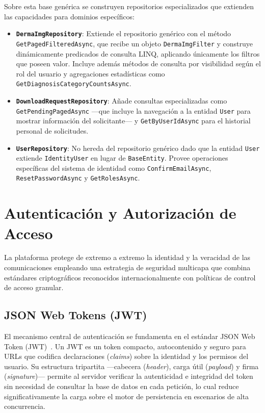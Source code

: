Sobre esta base genérica se construyen repositorios especializados que extienden las capacidades para 
dominios específicos:

\begin{itemize}
    \item \textbf{\texttt{DermaImgRepository}}: Extiende el repositorio genérico con el método 
    \texttt{GetPagedFilteredAsync}, que recibe un objeto \texttt{DermaImgFilter} y construye 
    dinámicamente predicados de consulta LINQ, aplicando únicamente los filtros que poseen valor. 
    Incluye además métodos de consulta por visibilidad según el rol del usuario y agregaciones 
    estadísticas como \texttt{GetDiagnosisCategoryCountsAsync}.
    \item \textbf{\texttt{DownloadRequestRepository}}: Añade consultas especializadas como 
    \texttt{GetPendingPagedAsync} ---que incluye la navegación a la entidad \texttt{User} 
    para mostrar información del solicitante--- y \texttt{GetByUserIdAsync} para el historial 
    personal de solicitudes.
    \item \textbf{\texttt{UserRepository}}: No hereda del repositorio genérico dado que la entidad 
    \texttt{User} extiende \texttt{IdentityUser} en lugar de \texttt{BaseEntity}. Provee operaciones 
    específicas del sistema de identidad como \texttt{ConfirmEmailAsync}, \texttt{ResetPasswordAsync} 
    y \texttt{GetRolesAsync}.
\end{itemize}


\section{Autenticación y Autorización de Acceso}
La plataforma protege de extremo a extremo la identidad y la veracidad de las comunicaciones empleando una 
estrategia de seguridad multicapa que combina estándares criptográficos reconocidos internacionalmente con 
políticas de control de acceso granular.

\subsection{JSON Web Tokens (JWT)}
El mecanismo central de autenticación se fundamenta en el estándar JSON Web Token (JWT)~\cite{rfc7519_jwt}. 
Un JWT es un token compacto, autocontenido y seguro para URLs que 
codifica declaraciones (\textit{claims}) sobre la identidad y los permisos del usuario. Su estructura 
tripartita ---cabecera (\textit{header}), carga útil (\textit{payload}) y firma (\textit{signature})--- 
permite al servidor verificar la autenticidad e integridad del token sin necesidad de consultar la base 
de datos en cada petición, lo cual reduce significativamente la carga sobre el motor de persistencia en 
escenarios de alta concurrencia.

